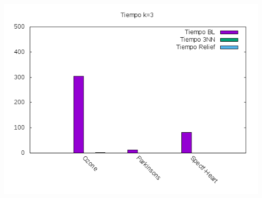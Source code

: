 \documentclass[12pt,a4paper]{article}
\begin{document}
	\newline
	\includegraphics*[scale=1]{./Imagenes/K3/tiempo.png}
	
\end{document}

